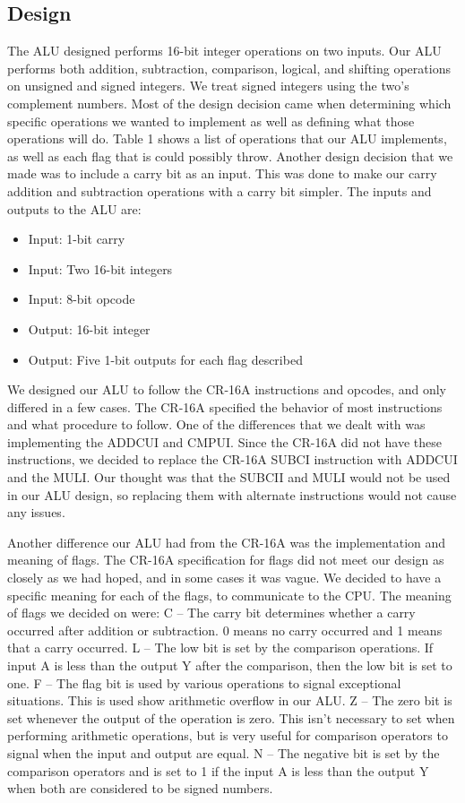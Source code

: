 \documentclass[11pt]{article}
\begin{document}
\subsection{Design}
The ALU designed performs 16-bit integer operations on two inputs. Our ALU performs both addition, subtraction, comparison, logical, and shifting operations on unsigned and signed integers. We treat signed integers using the two’s complement numbers. Most of the design decision came when determining which specific operations we wanted to implement as well as defining what those operations will do. Table 1 shows a list of operations that our ALU implements, as well as each flag that is could possibly throw. Another design decision that we made was to include a carry bit as an input. This was done to make our carry addition and subtraction operations with a carry bit simpler. The inputs and outputs to the ALU are:
\begin{itemize}
\item Input: 1-bit carry 
\item Input: Two 16-bit integers
\item Input: 8-bit opcode
\item Output: 16-bit integer
\item Output: Five 1-bit outputs for each flag described
\end{itemize}
We designed our ALU to follow the CR-16A instructions and opcodes, and only differed in a few cases. The CR-16A specified the behavior of most instructions and what procedure to follow.  One of the differences that we dealt with was implementing the ADDCUI and CMPUI. Since the CR-16A did not have these instructions, we decided to replace the CR-16A SUBCI instruction with ADDCUI and the MULI. Our thought was that the SUBCII and MULI would not be used in our ALU design, so replacing them with alternate instructions would not cause any issues. 

Another difference our ALU had from the CR-16A was the implementation and meaning of flags. The CR-16A specification for flags did not meet our design as closely as we had hoped, and in some cases it was vague. We decided to have a specific meaning for each of the flags, to communicate to the CPU. The meaning of flags we decided on were:
C – The carry bit determines whether a carry occurred after addition or subtraction. 0 means no carry occurred and 1 means that a carry occurred.
L – The low bit is set by the comparison operations. If input A is less than the output Y after the comparison, then the low bit is set to one.
F – The flag bit is used by various operations to signal exceptional situations. This is used show arithmetic overflow in our ALU.
Z – The zero bit is set whenever the output of the operation is zero. This isn’t necessary to set when performing arithmetic operations, but is very useful for comparison operators to signal when the input and output are equal.
N – The negative bit is set by the comparison operators and is set to 1 if the input A is less than the output Y when both are considered to be signed numbers.
\end{document}
